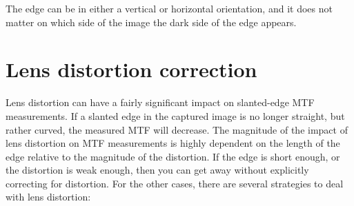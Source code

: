\documentclass[a4paper]{article}
\begin{document}
The edge can be in either a vertical or horizontal orientation, and it does
not matter on which side of the image the dark side of the edge
appears.

\section{Lens distortion correction}
\label{sec:lens_distortion}
Lens distortion can have a fairly significant impact on slanted-edge MTF
measurements. If a slanted edge in the captured image is no longer straight,
but rather curved, the measured MTF will decrease. The magnitude of the
impact of lens distortion on MTF measurements is highly dependent on the
length of the edge relative to the magnitude of the distortion. If the edge
is short enough, or the distortion is weak enough, then you can get away
without explicitly correcting for distortion. For the other cases, there 
are several strategies to deal with lens distortion:
\end{document}
